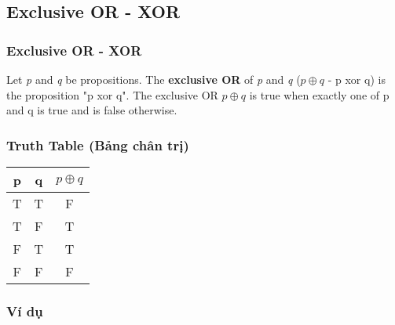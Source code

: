 \documentclass{beamer}
\begin{document}
\subsection{Exclusive OR - XOR}
\begin{frame}
    \frametitle{Exclusive OR - XOR}
    Let \textit{p} and \textit{q} be propositions. The \textbf{exclusive OR} of \textit{p} and \textit{q} ($p \oplus q$ - p xor q) is the proposition "p xor q". The exclusive OR $p \oplus q$ is true when exactly one of p and q is true and is false otherwise.
\end{frame}
\begin{frame}
    \frametitle{Truth Table (Bảng chân trị)}
    \begin{center}
        \begin{tabular}{|c|c|c|}
            \hline
            p & q & $p \oplus q$\\
            \hline
            T & T & F \\
            \hline
            T & F & T \\
            \hline
            F & T & T \\
            \hline
            F & F & F \\
            \hline
        \end{tabular}
        \end{center}
        \end{frame}
\begin{frame}
    \frametitle{Ví dụ}
\end{frame}
\end{document}
